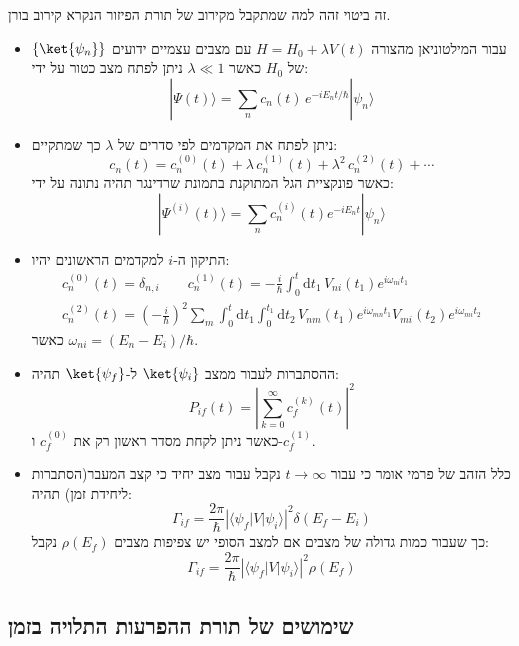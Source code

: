 \documentclass{tstextbook}
\begin{document}
\begin{remark}
זה ביטוי זהה למה שמתקבל מקירוב של תורת הפיזור הנקרא קירוב בורן.

\end{remark}
\begin{summary}
  \begin{itemize}
    \item עבור המילטוניאן מהצורה \(H=H_{0}+\lambda V(t)\) עם מצבים עצמיים ידועים \(\left\{  \ket{\psi_{n}}  \right\}\) של \(H_{0}\) כאשר \(\lambda\ll 1\) ניתן לפתח מצב כטור על ידי:
$$|\Psi(t)\rangle=\sum_{n}c_{n}(t)\,e^{-i E_{n}t/\hbar}|\psi_{n}\rangle$$
    \item ניתן לפתח את המקדמים לפי סדרים של \(\lambda\) כך שמתקיים:
$$c_{n}(t)=c_{n}^{(0)}(t)+\lambda\,c_{n}^{(1)}(t)+\lambda^{2}\,c_{n}^{(2)}(t)+\cdots$$
כאשר פונקציית הגל המתוקנת בתמונת שרדינגר תהיה נתונה על ידי:
$$|\Psi^{(i)}(t)\rangle=\sum_{n}c_{n}^{(i)}(t)e^{-i E_{n}t}|\psi_{n}\rangle$$
    \item התיקון ה-\(i\) למקדמים הראשונים יהיו:
$$\begin{gather}c_{n}^{(0)}(t)=\delta_{n,i}\qquad  c_{n}^{(1)}(t)=-\frac{i}{\hbar}\int_{0}^{t}\mathrm{d} t_{1}\,V_{n i}(t_{1})e^{i\omega_{n i}t_{1}}\\c_{n}^{(2)}(t)=\left(-\frac{i}{\hbar}\right)^{2}\sum_{m}\int_{0}^{t}\mathrm{d} t_{1}\int_{0}^{t_{1}}\mathrm{d} t_{2}\,V_{n m}(t_{1})e^{i\omega_{m n}t_{1}}V_{m i}(t_{2})e^{i\omega_{m i}t_{2}} 
\end{gather}$$
כאשר \(\omega_{ni}=(E_{n}-E_{i}) / \hbar\).
    \item ההסתברות לעבור ממצב \(\ket{\psi_{i}}\) ל-\(\ket{\psi_{f}}\) תהיה:
$$P_{i f}(t)=\left|\sum_{k=0}^{\infty}c_{f}^{(k)}(t)\right|^{2}$$
כאשר ניתן לקחת מסדר ראשון רק את \(c_{f}^{(0)}\) ו-\(c^{(1)}_{f}\).
    \item כלל הזהב של פרמי אומר כי עבור \(t\to \infty\) נקבל עבור מצב יחיד כי קצב המעבר(הסתברות ליחידת זמן) תהיה:
$$\Gamma_{i f}=\frac{2\pi}{\hbar}\left|\langle\psi_{f}|V|\psi_{i}\rangle\right|^{2}\delta(E_{f}-E_{i})$$
כך שעבור כמות גדולה של מצבים אם למצב הסופי יש צפיפות מצבים \(\rho(E_{f})\) נקבל:
$$\Gamma_{i f}=\frac{2\pi}{\hbar}\left|\langle\psi_{f}|V|\psi_{i}\rangle\right|^{2}\rho(E_{f})$$
  \end{itemize}
\end{summary}
\subsection{שימושים של תורת ההפרעות התלויה בזמן}
\end{document}
